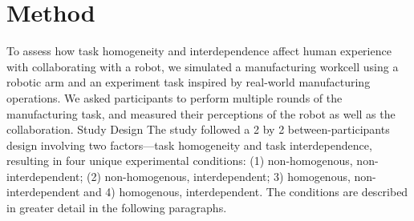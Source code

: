 \section{Method}
       To assess how task homogeneity and interdependence affect human experience with collaborating with a robot, we simulated a manufacturing workcell using a robotic arm and an experiment task inspired by real-world manufacturing operations.  We asked participants to perform multiple rounds of the manufacturing task, and measured their perceptions of the robot as well as the collaboration.
Study Design
       The study followed  a 2 by 2 between-participants design involving two factors—task homogeneity and task interdependence, resulting in four unique experimental conditions: (1) non-homogenous, non-interdependent; (2) non-homogenous, interdependent; 3) homogenous, non-interdependent and 4) homogenous, interdependent. The conditions are described in greater detail in the following paragraphs.

